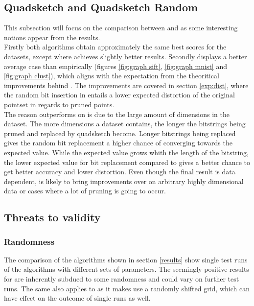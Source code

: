 \subsection{Quadsketch and Quadsketch Random}
This subsection will focus on the comparison between \qs{} and \qsr{} as some interesting notions appear from the results. 
\\
Firstly both algorithms obtain approximately the same best scores for the datasets, except \mnist{} where \qsr{} achieves slightly better results. 
Secondly \qsr{} displays a better average case than \qs{} empirically (figures \ref{fig:graph sift}, \ref{fig:graph mnist} and \ref{fig:graph clust}), which aligns with the expectation from the theoritical improvements behind \qsr{}. The improvements are covered in section \ref{exp:dist}, where the random bit insertion in \qsr{} entails a lower expected distortion of the original pointset in regards to pruned points.
\\
The reason \qsr{} outperforms \qs{} on \mnist{} is due to the large amount of dimensions in the \mnist{} dataset. The more dimensions a dataset contains, the longer the bitstrings being pruned and replaced by quadsketch become. Longer bitstrings being replaced gives the random bit replacement a higher chance of converging towards the expected value. While the expected value grows whith the length of the bitstring, the lower expected value for \qsr{} bit replacement compared to \qs{} gives \qsr{} a better chance to get better accuracy and lower distortion. Even though the final result is data dependent, \qsr{} is likely to bring improvements over \qs{} on arbitrary highly dimensional data or cases where a lot of pruning is going to occur.

\subsection{Threats to validity}

\subsubsection{Randomness}
\label{disc/threats/randomness}
The comparison of the algorithms shown in section \ref{results} show single test runs of the algorithms with different sets of parameters. The seemingly positive results for \qsr{} are inherently subdued to some randomness and could vary on further test runs. The same also applies to \qs{} as it makes use a randomly shifted grid, which  can have effect on the outcome of single runs as well.

